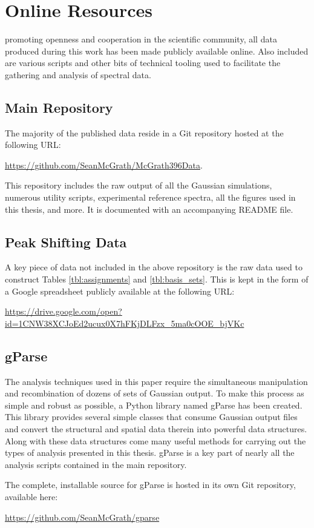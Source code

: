 \chapter{Online Resources}

 promoting openness and cooperation in the scientific community, all data produced during this work has been made publicly available online. Also included are various scripts and other bits of technical tooling used to facilitate the gathering and analysis of spectral data.

\section{Main Repository}

The majority of the published data reside in a Git repository hosted at the following URL:

\bigskip
\noindent\href{https://github.com/SeanMcGrath/McGrath396Data}{https://github.com/SeanMcGrath/McGrath396Data}.

\bigskip
\noindent This repository includes the raw output of all the Gaussian simulations, numerous utility scripts, experimental reference spectra, all the figures used in this thesis, and more. It is documented with an accompanying README file.

\section{Peak Shifting Data}

A key piece of data not included in the above repository is the raw data used to construct Tables \ref{tbl:assignments} and \ref{tbl:basis_sets}. This is kept in the form of a Google spreadsheet publicly available at the following URL:

\noindent\href{https://drive.google.com/open?id=1CNW38XCJoEd2ucux0X7hFKjDLFzx_5ma0cOOE_bjVKc}{https://drive.google.com/open?id=1CNW38XCJoEd2ucux0X7hFKjDLFzx\_5ma0cOOE\_bjVKc}

\section{gParse}

The analysis techniques used in this paper require the simultaneous manipulation and recombination of dozens of sets of Gaussian output. To make this process as simple and robust as possible, a Python library named gParse has been created. This library provides several simple classes that consume Gaussian output files and convert the structural and spatial data therein into powerful data structures. Along with these data structures come many useful methods for carrying out the types of analysis presented in this thesis. gParse is a key part of nearly all the analysis scripts contained in the main repository.

The complete, installable source for gParse is hosted in its own Git repository, available here:

\bigskip
\href{https://github.com/SeanMcGrath/gparse}{https://github.com/SeanMcGrath/gparse}